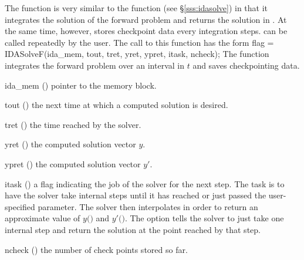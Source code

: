 The function  is very similar to the {\idas} function 
(see \S\ref{sss:idasolve}) in that it integrates the solution of the forward
problem and returns the solution in . At the same time, however, 
 stores checkpoint data every  integration steps.  
can be called repeatedly by the user.
The call to this function has the form
{
  flag = IDASolveF(ida\_mem, tout, tret, yret, ypret, itask, ncheck);
}
{
  The function  integrates the forward problem over an interval in $t$
  and saves checkpointing data.
}
{
  \begin{args}
  \item[ida\_mem] ()
    pointer to the {\idas} memory block.
  \item[tout] ()
    the next time at which a computed solution is desired.
  \item[tret] ()
    the time reached by the solver.
  \item[yret] ()
    the computed solution vector $y$.
  \item[ypret] ()
    the computed solution vector $y'$.
  \item[itask] ()
    a flag indicating the job of the solver for the next step. 
    The  task is to have the solver take internal steps until   
    it has reached or just passed the user-specified 
    parameter. The solver then interpolates in order to   
    return an approximate value of $y($$)$ and $y'($$)$. 
    The  option tells the solver to just take one internal step  
    and return the solution at the point reached by that step. 
  \item[ncheck] ()
    the number of check points stored so far.
  \end{args}
}
